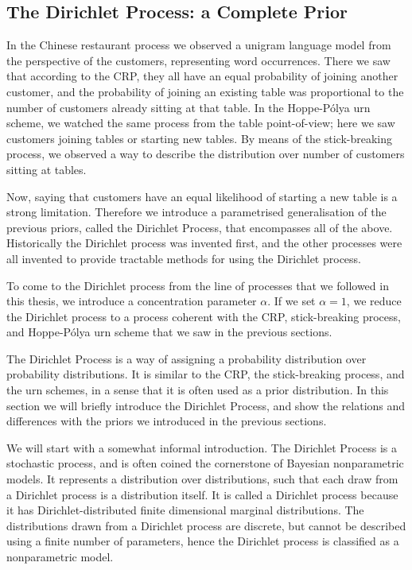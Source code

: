 
%


\subsection{The Dirichlet Process: a Complete Prior}
In the Chinese restaurant process we observed a unigram language model from the perspective of the customers, representing word occurrences. There we saw that according to the CRP, they all have an equal probability of joining another customer, and the probability of joining an existing table was proportional to the number of customers already sitting at that table. In the Hoppe-P\'olya urn scheme, we watched the same process from the table point-of-view; here we saw customers joining tables or starting new tables. By means of the stick-breaking process, we observed a way to describe the distribution over number of customers sitting at tables.

Now, saying that customers have an equal likelihood of starting a new table is a strong limitation. Therefore we introduce a parametrised generalisation of the previous priors, called the Dirichlet Process, that encompasses all of the above. Historically the Dirichlet process was invented first, and the other processes were all invented to provide tractable methods for using the Dirichlet process. 

To come to the Dirichlet process from the line of processes that we followed in this thesis, we introduce a concentration parameter $\alpha $. If we set $\alpha = 1$, we reduce the Dirichlet process to a process coherent with the CRP, stick-breaking process, and Hoppe-P\'olya urn scheme that we saw in the previous sections.  

The Dirichlet Process is a way of assigning a probability distribution over probability distributions. It is similar to the CRP, the stick-breaking process, and the urn schemes, in a sense that it is often used as a prior distribution. In this section we will briefly introduce the Dirichlet Process, and show the relations and differences with the priors we introduced in the previous sections.

We will start with a somewhat informal introduction. The Dirichlet Process is a stochastic process, and is often coined the cornerstone of Bayesian nonparametric models. It represents a distribution over distributions, such that each draw from a Dirichlet process is a distribution itself. It is called a Dirichlet process because it has Dirichlet-distributed finite dimensional marginal distributions. The distributions drawn from a Dirichlet process are discrete, but cannot be described using a finite number of parameters, hence the Dirichlet process is classified as a nonparametric model.

